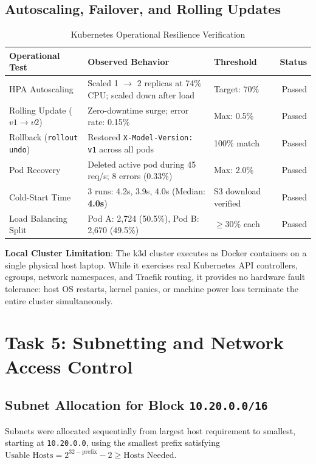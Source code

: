 \documentclass[10pt,a4paper]{article}
\begin{document}
\subsection{Autoscaling, Failover, and Rolling Updates}
\begin{table}[h!]
\centering
\small
\caption{Kubernetes Operational Resilience Verification}
\begin{tabularx}{\textwidth}{l X l r}
\toprule
\textbf{Operational Test} & \textbf{Observed Behavior} & \textbf{Threshold} & \textbf{Status} \\
\midrule
HPA Autoscaling & Scaled 1 $\to$ 2 replicas at 74\% CPU; scaled down after load & Target: 70\% & Passed \\
Rolling Update ($v1 \to v2$) & Zero-downtime surge; error rate: 0.15\% & Max: 0.5\% & Passed \\
Rollback (\texttt{rollout undo}) & Restored \texttt{X-Model-Version: v1} across all pods & 100\% match & Passed \\
Pod Recovery & Deleted active pod during 45 req/s; 8 errors (0.33\%) & Max: 2.0\% & Passed \\
Cold-Start Time & 3 runs: 4.2s, 3.9s, 4.0s (Median: \textbf{4.0s}) & S3 download verified & Passed \\
Load Balancing Split & Pod A: 2,724 (50.5\%), Pod B: 2,670 (49.5\%) & $\ge 30\%$ each & Passed \\
\bottomrule
\end{tabularx}
\end{table}

\noindent\textbf{Local Cluster Limitation}: The k3d cluster executes as Docker containers on a single physical host laptop. While it exercises real Kubernetes API controllers, cgroups, network namespaces, and Traefik routing, it provides no hardware fault tolerance: host OS restarts, kernel panics, or machine power loss terminate the entire cluster simultaneously.

\section{Task 5: Subnetting and Network Access Control}

\subsection{Subnet Allocation for Block \texttt{10.20.0.0/16}}
Subnets were allocated sequentially from largest host requirement to smallest, starting at \texttt{10.20.0.0}, using the smallest prefix satisfying $\text{Usable Hosts} = 2^{32-\text{prefix}} - 2 \ge \text{Hosts Needed}$.
\end{document}
